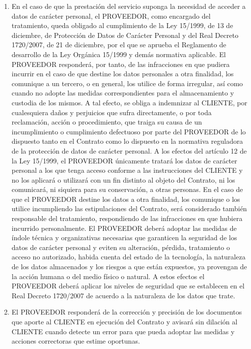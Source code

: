 \begin{description}[style=nextline]
\begin{enumerate}
\begin{enumerate}
    \item En el caso de que la prestación del servicio suponga la necesidad de acceder a datos de carácter personal, el PROVEEDOR, como encargado del tratamiento, queda obligado al cumplimiento de la Ley 15/1999, de 13 de diciembre, de Protección de Datos de Carácter Personal y del Real Decreto 1720/2007, de 21 de diciembre, por el que se aprueba el Reglamento de desarrollo de la Ley Orgánica 15/1999 y demás normativa aplicable.
    El PROVEEDOR responderá, por tanto, de las infracciones en que pudiera incurrir en el caso de que destine los datos personales a otra finalidad, los comunique a un tercero, o en general, los utilice de forma irregular, así como cuando no adopte las medidas correspondientes para el almacenamiento y custodia de los mismos. A tal efecto, se obliga a indemnizar al CLIENTE, por cualesquiera daños y perjuicios que sufra directamente, o por toda reclamación, acción o procedimiento, que traiga su causa de un incumplimiento o cumplimiento defectuoso por parte del PROVEEDOR de lo dispuesto tanto en el Contrato como lo dispuesto en la normativa reguladora de la protección de datos de carácter personal.
    A los efectos del artículo 12 de la Ley 15/1999, el PROVEEDOR únicamente tratará los datos de carácter personal a los que tenga acceso conforme a las instrucciones del CLIENTE y no los aplicará o utilizará con un fin distinto al objeto del Contrato, ni los comunicará, ni siquiera para su conservación, a otras personas. En el caso de que el PROVEEDOR destine los datos a otra finalidad, los comunique o los utilice incumpliendo las estipulaciones del Contrato, será considerado también responsable del tratamiento, respondiendo de las infracciones en que hubiera incurrido personalmente.
    El PROVEEDOR deberá adoptar las medidas de índole técnica y organizativas necesarias que garanticen la seguridad de los datos de carácter personal y eviten su alteración, pérdida, tratamiento o acceso no autorizado, habida cuenta del estado de la tecnología, la naturaleza de los datos almacenados y los riesgos a que están expuestos, ya provengan de la acción humana o del medio físico o natural. A estos efectos el PROVEEDOR deberá aplicar los niveles de seguridad que se establecen en el Real Decreto 1720/2007 de acuerdo a la naturaleza de los datos que trate.
    \item El PROVEEDOR responderá de la corrección y precisión de los documentos que aporte al CLIENTE en ejecución del Contrato y avisará sin dilación al CLIENTE cuando detecte un error para que pueda adoptar las medidas y acciones correctoras que estime oportunas.

\end{enumerate}
\end{enumerate}
\end{description}
